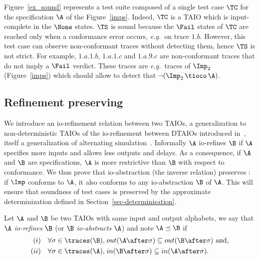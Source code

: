 \documentclass{LMCS}
\theoremstyle{plain}\newtheorem{proposition}[thm]{Proposition}
\def\eg{{\em e.g.}}
\begin{document}
\begin{exa}
Figure~\ref{ex_sound} represents a test suite composed of a single test case $\TC$ for the specification $\A$ of the Figure~\ref{imps}. Indeed, $\TC$ is a TAIO which is input-complete in the $\None$ states.
$\TS$ is sound because
the $\Fail$ states of $\TC$ are reached only when a conformance error occurs,
\eg~on trace $1.b$. 
However, this test case can observe non-conformant traces without detecting them, hence $\TS$ is not strict. For example, $1.a.1.b$, $1.a.1.c$ and $1.a.9.c$ are non-conformant traces that do not imply a  $\Fail$ verdict. 
These traces are \eg~traces of $\Imp_2$ (Figure~\ref{imps}) which should allow
to detect that $\neg(\Imp_2 \,\tioco\, \A)$.
\end{exa}

\subsection{Refinement preserving \tioco}
We introduce an io-refinement relation between two TAIOs, a
generalization to non-deterministic TAIOs of the 
io-refinement  between DTAIOs introduced
in~\cite{David-Larsen-etal-HSCC10}, itself a generalization of
alternating simulation~\cite{Alur-Henzinger-Kupferman-Vardi-CONCUR98}.
Informally $\A$ io-refines $\B$ if $\A$ specifies more inputs and allows 
less outputs and delays.
As a consequence,  if $\A$ and $\B$ are specifications,
$\A$ is more restrictive than $\B$ with respect to conformance.
We thus prove that io-abstraction (the inverse relation) preserves \tioco:
if $\Imp$ conforms to $\A$, it also conforms to any io-abstraction
$\B$ of $\A$.  This will  ensure that  soundness of test cases is
preserved by the approximate determinization defined in Section~\ref{sec-determinisation}.


\begin{defi}
  Let $\A$ and $\B$ be two TAIOs with same input and output alphabets,
  we say that $\A$ {\em io-refines} $\B$ (or $\B$ {\em io-abstracts}
  $\A$) and note $\A \preceq \B$ if
\begin{equation*}
\begin{aligned}
(i) \quad \forall \sigma \in \traces(\B), \; & out(\A \after  \sigma)  \subseteq out(\B  \after \sigma) \text{ and,}\\
(ii) \quad \forall \sigma \in \traces(\A), \; & in(\B  \after  \sigma)  \subseteq in(\A  \after  \sigma).
\end{aligned}
\end{equation*}
\end{defi}
\end{document}

